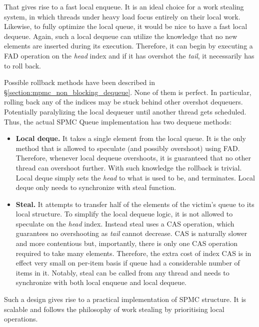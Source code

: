 \documentclass[12pt,a4paper,twoside]{report}
\begin{document}
That gives rise to a fast local enqueue. It is an ideal choice for a work stealing system, in which threads under heavy load focus entirely on their local work. Likewise, to fully optimize the local queue, it would be nice to have a fast local dequeue. Again, such a local dequeue can utilize the knowledge that no new elements are inserted during its execution. Therefore, it can begin by executing a FAD operation on the \textit{head} index and if it has overshot the \textit{tail}, it necessarily has to roll back. 

Possible rollback methods have been described in \S\ref{section:mpmc_non_blocking_dequeue}. None of them is perfect. In particular, rolling back any of the indices may be stuck behind other overshot dequeuers. Potentially paralylizing the local dequeuer until another thread gets scheduled. Thus, the actual SPMC Queue implementation has two dequeue methods:
\begin{itemize}
    \item \textbf{Local deque.} It takes a single element from the local queue. It is the only method that is allowed to speculate (and possibly overshoot) using FAD. Therefore, whenever local dequeue overshoots, it is guaranteed that no other thread can overshoot further. With such knowledge the rollback is trivial. Local deque simply sets the \textit{head} to what is used to be, and terminates. Local deque only needs to synchronize with steal function.  
    \item \textbf{Steal.} It attempts to transfer half of the elements of the victim's queue to its local structure. To simplify the local dequeue logic, it is not allowed to speculate on the \textit{head} index. Instead steal uses a CAS operation, which guarantees no overshooting as \textit{tail} cannot decrease. CAS is naturally slower and more contentious but, importantly, there is only one CAS operation required to take many elements. Therefore, the extra cost of index CAS is in effect very small on per-item basis if queue had a considerable number of items in it. Notably, steal can be called from any thread and needs to synchronize with both local enqueue and local dequeue. 
\end{itemize}

Such a design gives rise to a practical implementation of SPMC structure. It is scalable and follows the philosophy of work stealing by prioritising local operations. 
\end{document}
